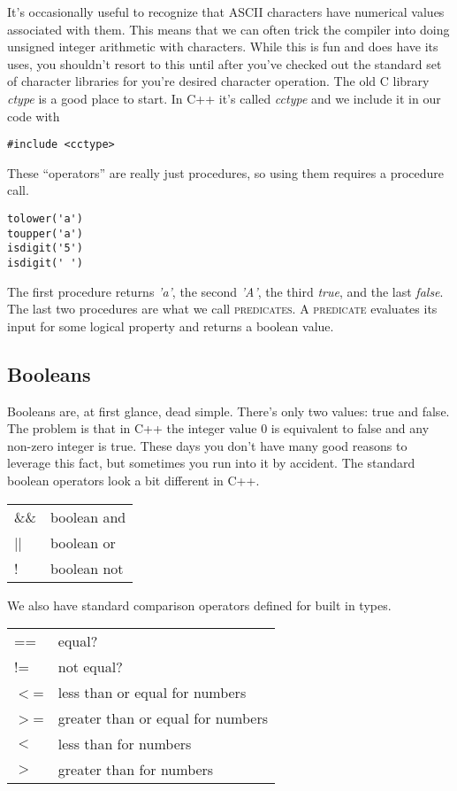 \documentclass[]{tufte-handout}
\begin{document}
It's occasionally useful to recognize that ASCII characters have numerical values associated with them. This means that we can often trick the compiler into doing unsigned integer arithmetic with characters.   While this is fun and does have its uses, you shouldn't resort to this until after you've checked out the standard set of character libraries for you're desired character operation. The old C library \textit{ctype} is a good place to start. In C++ it's called \textit{cctype} and we include it in our code with 
\begin{verbatim}
#include <cctype>
\end{verbatim} 

These ``operators'' are really just procedures, so using them requires a procedure call.
\begin{verbatim}
tolower('a')
toupper('a')
isdigit('5')
isdigit(' ')
\end{verbatim}
The first procedure returns \textit{'a'}, the second \textit{'A'}, the third \textit{true}, and the last \textit{false}. The last two procedures are what we call \textsc{predicates}. A \textsc{predicate} evaluates its input for some logical property and returns a boolean value.


\subsection{Booleans}

Booleans are, at first glance, dead simple. There's only two values: true and false.  The problem is that in C++ the integer value 0 is equivalent to false and any non-zero integer is true.  These days you don't have many good reasons to leverage this fact, but sometimes you run into it by accident. The standard boolean operators look a bit different in C++.

\begin{center}
\begin{tabular}{ll}
\&\& & boolean and \\
|| & boolean or \\
! & boolean not \\
\end{tabular}
\end{center}


We also have standard comparison operators defined for built in types. 

\begin{center}
\begin{tabular}{ll}
== & equal? \\
!= & not equal? \\
$<$= & less than or equal for numbers \\
$>$= & greater than or equal for numbers \\
$<$ & less than for numbers \\
$>$ & greater than for numbers
\end{tabular}
\end{center}
\end{document}

